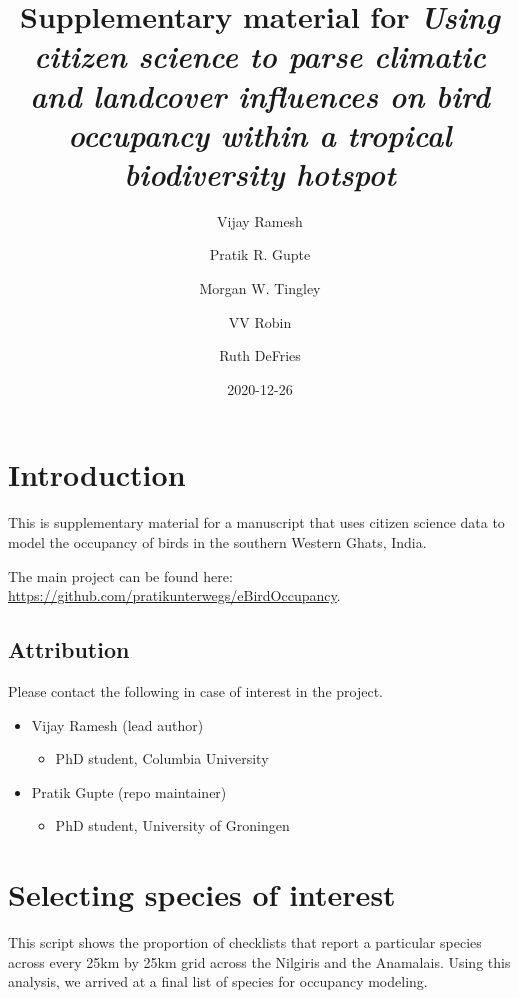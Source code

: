 \documentclass[]{article}
\title{Supplementary material for \emph{Using citizen science to parse climatic and landcover influences on bird occupancy within a tropical biodiversity hotspot}}
\author{Vijay Ramesh \and Pratik R. Gupte \and Morgan W. Tingley \and VV Robin \and Ruth DeFries}
\date{2020-12-26}
\providecommand{\tightlist}{%
  \setlength{\itemsep}{0pt}\setlength{\parskip}{0pt}}
\begin{document}
\maketitle


\linenumbers

{
\setcounter{tocdepth}{2}
\tableofcontents
}
\hypertarget{introduction}{%
\section{Introduction}\label{introduction}}

This is supplementary material for a manuscript that uses citizen science data to model the occupancy of birds in the southern Western Ghats, India.

The main project can be found here: \url{https://github.com/pratikunterwegs/eBirdOccupancy}.

\hypertarget{attribution}{%
\subsection{Attribution}\label{attribution}}

Please contact the following in case of interest in the project.

\begin{itemize}
\tightlist
\item
  Vijay Ramesh (lead author)

  \begin{itemize}
  \tightlist
  \item
    PhD student, Columbia University
  \end{itemize}
\item
  Pratik Gupte (repo maintainer)

  \begin{itemize}
  \tightlist
  \item
    PhD student, University of Groningen
  \end{itemize}
\end{itemize}

\hypertarget{selecting-species-of-interest}{%
\section{Selecting species of interest}\label{selecting-species-of-interest}}

This script shows the proportion of checklists that report a particular species across every 25km by 25km grid across the Nilgiris and the Anamalais. Using this analysis, we arrived at a final list of species for occupancy modeling.
\end{document}
